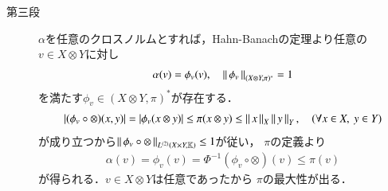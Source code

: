 \begin{prf}
\begin{description}
			\item[第三段]
				$\alpha$を任意のクロスノルムとすれば，Hahn-Banachの定理より任意の$v \in X \otimes Y$に対し
				\begin{align}
					\alpha(v) = \phi_v(v),
					\quad \Norm{\phi_v}{(X \otimes Y,\pi)^*} = 1
				\end{align}
				を満たす$\phi_v \in (X \otimes Y,\pi)^*$が存在する．
				\begin{align}
					\left| (\phi_v \circ \otimes)(x,y) \right|
					= \left|\phi_v(x \otimes y)\right| 
					\leq \pi(x \otimes y)
					\leq \Norm{x}{X} \Norm{y}{Y},
					\quad (\forall x \in X,\ y \in Y)
				\end{align}
				が成り立つから$\Norm{\phi_v \circ \otimes}{\ContLn{X \times Y}{\K}{2}} \leq 1$が従い，
				$\pi$の定義より
				\begin{align}
					\alpha(v) = \phi_v(v) = \Phi^{-1}(\phi_v \circ \otimes)(v)
					\leq \pi(v)
				\end{align}
				が得られる．$v \in X \otimes Y$は任意であったから
				$\pi$の最大性が出る．
				\QED
		\end{description}
	\end{prf}